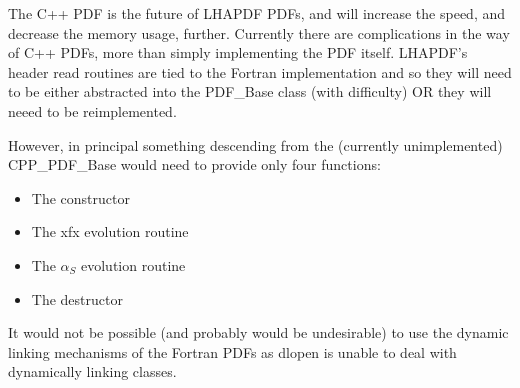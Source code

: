 The C++ PDF is the future of LHAPDF PDFs, and will increase the speed, and
decrease the memory usage, further. Currently there are complications in
the way of C++ PDFs, more than simply implementing the PDF itself.
LHAPDF's header read routines are tied to the Fortran implementation and so
they will need to be either abstracted into the PDF\_Base class (with
difficulty) OR they will neeed to be reimplemented.

However, in principal something descending from the (currently 
unimplemented) CPP\_PDF\_Base would need to provide only four functions:
\begin{itemize}
  \item The constructor
  \item The xfx evolution routine
  \item The $\alpha_S$ evolution routine
  \item The destructor
\end{itemize}

It would not be possible (and probably would be undesirable) to use the
dynamic linking mechanisms of the Fortran PDFs as dlopen is unable to deal
with dynamically linking classes.
